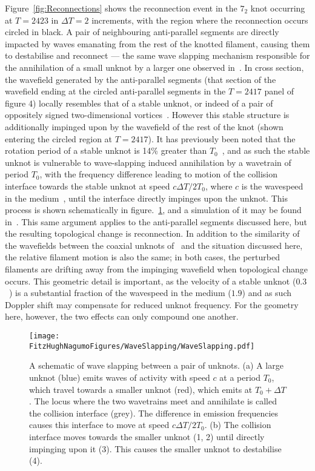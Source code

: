 Figure~\ref{fig:Reconnections} shows the reconnection event in the $7_2$ knot occurring at $T=2423$ in $\Delta T=2$ increments, with the region where the reconnection occurs circled in black. A pair of neighbouring anti-parallel segments are directly impacted by waves emanating from the rest of the knotted filament, causing them to destabilise and reconnect --- the same wave slapping mechanism responsible for the annihilation of a small unknot by a larger one observed in~\citep{Maucher2018}. In cross section, the wavefield generated by the anti-parallel segments (that section of the wavefield ending at the circled anti-parallel segments in the $T=2417$ panel of figure 4) locally resembles that of a stable unknot, or indeed of a pair of oppositely signed two-dimensional vortices~\citep{Courtemanche1990}. However this stable structure is additionally impinged upon by the wavefield of the rest of the knot (shown entering the circled region at $T=2417$). It has previously been noted that the rotation period of a stable unknot is 14\% greater than $T_0$~\citep{Maucher2018}, and as such the stable unknot is vulnerable to wave-slapping induced annihilation by a wavetrain of period $T_0$, with the frequency difference leading to motion of the collision interface towards the stable unknot at speed $c\Delta T/2T_0$, where $c$ is the wavespeed in the medium~\citep{Courtemanche1990,WinfreeChapter}, until the interface directly impinges upon the unknot. This process is shown schematically in figure.~\ref{fig:WaveSlapping}, and a simulation of it may be found in~\citep{Courtemanche1990}. This same argument applies to the anti-parallel segments discussed here, but the resulting topological change is reconnection. In addition to the similarity of the wavefields between the coaxial unknots of~\citep{Maucher2018} and the situation discussed here, the relative filament motion is also the same; in both cases, the perturbed filaments are drifting away from the impinging wavefield when topological change occurs. This geometric detail is important, as the velocity of a stable unknot ($0.3$~\citep{Maucher2018}) is a substantial fraction of the wavespeed in the medium ($1.9$) and as such Doppler shift may compensate for reduced unknot frequency. For the geometry here, however, the two effects can only compound one another. 
\begin{figure}[htbp]
    \texttt{[image: \\FitzHughNagumoFigures/WaveSlapping/WaveSlapping.pdf]}
    \caption[Wave slapping]{\label{fig:WaveSlapping} A schematic of wave slapping between a pair of unknots. (a) A large unknot (blue) emits waves of activity with speed $c$ at a period $T_0$, which travel towards a smaller unknot (red), which emits at $T_0 + \Delta T$. The locus where the two wavetrains meet and annihilate is called the collision interface (grey). The difference in emission frequencies causes this interface to move at speed $c\Delta T/2T_0$. (b) The collision interface moves towards the smaller unknot (1, 2) until directly impinging upon it (3). This causes the smaller unknot to destabilise (4).}
\end{figure}

